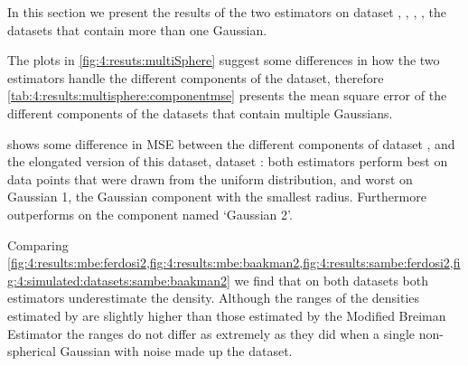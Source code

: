 In this section we present the results of the two estimators on dataset \ferdosiTwo, \baakmanTwo, \ferdosiThree, \baakmanThree, \ie the datasets that contain more than one Gaussian.

The plots in \cref{fig:4:resuts:multiSphere} suggest some differences in how the two estimators handle the different components of the dataset, therefore \cref{tab:4:results:multisphere:componentmse} presents the mean square error of the different components of the datasets that contain multiple Gaussians. 

\begin{table*}
	\centering
	
	\caption{The mean squared error of the known densities and the densities estimated by the Modified Breiman Estimator (\mbe) and the shape-adaptive MBE (\sambe), respectively, for the different components of the datasets with multiple Gaussians.} 	
	\label{tab:4:results:multisphere:componentmse}
\end{table*}

	 shows some difference in MSE between the different components of dataset \ferdosiTwo, and the elongated version of this dataset, \ie dataset \baakmanTwo: both estimators perform best on data points that were drawn from the uniform distribution, and worst on Gaussian 1, the Gaussian component with the smallest radius. Furthermore \sambe outperforms \mbe on the component named `Gaussian 2'.

	Comparing \cref{fig:4:results:mbe:ferdosi2,fig:4:results:mbe:baakman2,fig:4:results:sambe:ferdosi2,fig:4:simulated:datasets:sambe:baakman2} we find that on both datasets both estimators underestimate the density. Although the ranges of the densities estimated by \sambe are slightly higher than those estimated by the Modified Breiman Estimator the ranges do not differ as extremely as they did when a single non-spherical Gaussian with noise made up the dataset. 






\begin{figure*}
	\centering
	
	\caption{Comparative plots for dataset \ferdosiTwoNum, \ferdosiThreeNum, \baakmanTwoNum, and \baakmanThreeNum.}
	\label{fig:4:resuts:multiSphere}
\end{figure*}

